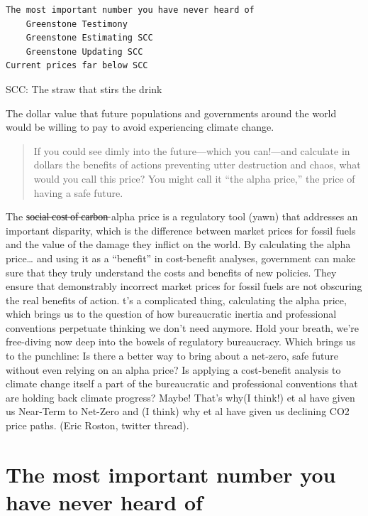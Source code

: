 \documentclass[
]{book}
\begin{document}
\begin{verbatim}
The most important number you have never heard of
    Greenstone Testimony
    Greenstone Estimating SCC
    Greenstone Updating SCC     
Current prices far below SCC
\end{verbatim}

SCC: The straw that stirs the drink

The dollar value that future populations and governments around the
world would be willing to pay to avoid experiencing climate change.

\begin{quote}
If you could see dimly into the future---which you can!---and calculate in dollars the benefits of actions preventing utter destruction and chaos, what would you call this price?
You might call it ``the alpha price,'' the price of having a safe future.
\end{quote}

The s̶o̶c̶i̶a̶l̶ ̶c̶o̶s̶t̶ ̶o̶f̶ ̶c̶a̶r̶b̶o̶n̶ alpha price is a regulatory tool (yawn) that addresses an important disparity, which is the difference between market prices for fossil fuels and the value of the damage they inflict on the world. By calculating the alpha price\ldots{}
and using it as a ``benefit'' in cost-benefit analyses, government can make sure that they truly understand the costs and benefits of new policies. They ensure that demonstrably incorrect market prices for fossil fuels are not obscuring the real benefits of action.
t's a complicated thing, calculating the alpha price, which brings us to the question of how bureaucratic inertia and professional conventions perpetuate thinking we don't need anymore.
Hold your breath, we're free-diving now deep into the bowels of regulatory bureaucracy.
Which brings us to the punchline: Is there a better way to bring about a net-zero, safe future without even relying on an alpha price? Is applying a cost-benefit analysis to climate change itself a part of the bureaucratic and professional conventions that are holding back climate progress? Maybe! That's why(I think!) \citet{noahqk} et al have given us Near-Term to Net-Zero and (I think) why \citet{GernotWagner}
et al have given us declining CO2 price paths.
(Eric Roston, twitter thread).

\hypertarget{the-most-important-number-you-have-never-heard-of}{%
\section{The most important number you have never heard of}\label{the-most-important-number-you-have-never-heard-of}}
\end{document}
